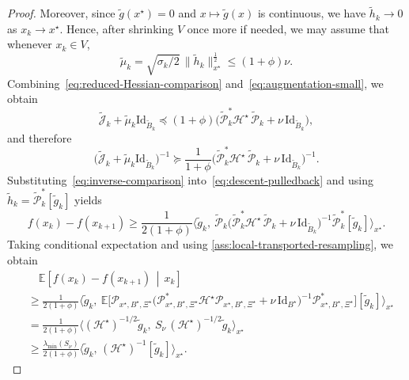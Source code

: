 \documentclass[10pt,a4paper]{amsart}
\begin{document}
\begin{proof}
Moreover, since $\widetilde g(x^\star)=0$ and $x\mapsto \widetilde g(x)$ is continuous, we have $\widetilde h_k\to 0$ as $x_k\to x^\star$. Hence, after shrinking $V$ once more if needed, we may assume that whenever $x_k\in V$,
\begin{equation}
\tilde{\mu}_k
=
\sqrt{\sigma_k/2}\,\|\widetilde h_k\|_{x^\star}^{\frac{1}{2}}
\le
(1+\phi)\nu.
\label{eq:augmentation-small}
\end{equation}
Combining~\eqref{eq:reduced-Hessian-comparison} and~\eqref{eq:augmentation-small}, we obtain
\[
\widetilde{\mathcal J}_k+\tilde{\mu}_k\mathrm{Id}_{\widetilde B_k}
\preceq
(1+\phi)\bigl(\widetilde{\mathcal P}_k^*\mathcal{H}^\star\,\widetilde{\mathcal P}_k+\nu\,\mathrm{Id}_{\widetilde B_k}\bigr),
\]
and therefore
\begin{equation}
\bigl(\widetilde{\mathcal J}_k+\tilde{\mu}_k\mathrm{Id}_{\widetilde B_k}\bigr)^{-1}
\succeq
\frac{1}{1+\phi}
\bigl(\widetilde{\mathcal P}_k^*\mathcal{H}^\star\,\widetilde{\mathcal P}_k+\nu\,\mathrm{Id}_{\widetilde B_k}\bigr)^{-1}.
\label{eq:inverse-comparison}
\end{equation}
Substituting~\eqref{eq:inverse-comparison} into~\eqref{eq:descent-pulledback} and using $\widetilde h_k=\widetilde{\mathcal P}_k^*[\widetilde g_k]$ yields
\[
f(x_k)-f(x_{k+1})
\ge
\frac{1}{2(1+\phi)}
\Big\langle
\widetilde g_k,\
\widetilde{\mathcal P}_k
\bigl(\widetilde{\mathcal P}_k^*\mathcal{H}^\star\,\widetilde{\mathcal P}_k+\nu\,\mathrm{Id}_{\widetilde B_k}\bigr)^{-1}
\widetilde{\mathcal P}_k^*[\widetilde g_k]
\Big\rangle_{x^\star}.
\]
Taking conditional expectation and using \cref{ass:local-transported-resampling}, we obtain
\begin{align}
&\quad \mathbb E\!\left[f(x_k)-f(x_{k+1})\,\middle|\,x_k\right] \\
&\ge
\frac{1}{2(1+\phi)}
\Big\langle
\widetilde g_k,\
\mathbb E\Big[
\mathcal P_{x^\star,B^\star,\Xi^\star}
\bigl(
\mathcal P_{x^\star,B^\star,\Xi^\star}^{*}\mathcal{H}^\star\mathcal P_{x^\star,B^\star,\Xi^\star}
+\nu\,\mathrm{Id}_{B^\star}
\bigr)^{-1}
\mathcal P_{x^\star,B^\star,\Xi^\star}^{*}
\Big][\widetilde g_k]
\Big\rangle_{x^\star} \nonumber\\
&=
\frac{1}{2(1+\phi)}
\Big\langle
(\mathcal{H}^\star)^{-1/2}\widetilde g_k,\
S_{\nu}\,(\mathcal{H}^\star)^{-1/2}\widetilde g_k
\Big\rangle_{x^\star} \nonumber\\
&\ge
\frac{\lambda_{\min}(S_{\nu})}{2(1+\phi)}
\big\langle
\widetilde g_k,\,
(\mathcal{H}^\star)^{-1}[\widetilde g_k]
\big\rangle_{x^\star}.
\label{eq:expected-descent-pulledback}

\end{align}
\end{proof}
\end{document}
